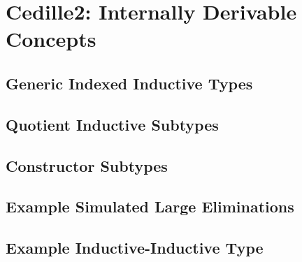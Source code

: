 \chapter{Cedille2: Internally Derivable Concepts}

\section{Generic Indexed Inductive Types}

\section{Quotient Inductive Subtypes}

\section{Constructor Subtypes}

\section{Example Simulated Large Eliminations}

\section{Example Inductive-Inductive Type}
